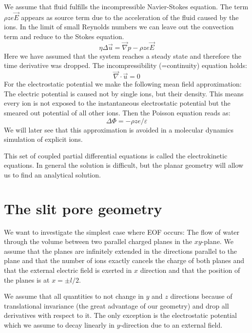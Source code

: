 We assume that fluid fulfills the incompressible Navier-Stokes equation.
The term $\rho z e \vec{E}$ appears as source term due
to the acceleration of the fluid caused by the ions. 
In the limit of small Reynolds numbers we can leave out
the convection term and reduce to the Stokes equation.
\begin{equation}
  \eta \Delta \vec{u} = \vec{\nabla} p - \rho z e \vec{E}
\end{equation}
Here we have assumed that the system reaches a steady
state and therefore the time derivative was dropped.
The incompressibility (=continuity) equation holds:
\begin{equation}
  \vec{\nabla} \cdot \vec{u} = 0
\end{equation}
For the electrostatic potential we make the following
mean field approximation: The electric potential is 
caused not by single ions, but their density. This means
every ion is not exposed to the instantaneous electrostatic potential
but the smeared out potential of all other ions. Then the Poisson
equation reads as:
\begin{equation}
  \Delta \Phi = -\rho z e/\varepsilon
  \label{asdf}
\end{equation}
We will later
see that this approximation is avoided in a molecular dynamics simulation
of explicit ions.

This set of coupled partial differential equations is called
the electrokinetic equations. In general the solution is difficult,
but the planar geometry will allow us to find an analytical 
solution.

\section{The slit pore geometry}
We want to investigate the simplest case where EOF occurs:
The flow of water through the volume between two parallel
charged planes in the $xy$-plane. We assume that the planes are infinitely
extended in the directions parallel to the plane and that
the number of ions exactly cancels the charge of both planes
and that the external electric field is exerted in $x$ direction
and that the position of the planes is at $x=\pm l/2$.

We assume that all quantities to not change in $y$ and $z$ directions
because of translational invariance (the great advantage of our geometry)
and drop all derivatives with respect to it. The only exception
is the electrostatic potential which we assume to decay linearly in
$y$-direction due to an external field. 


